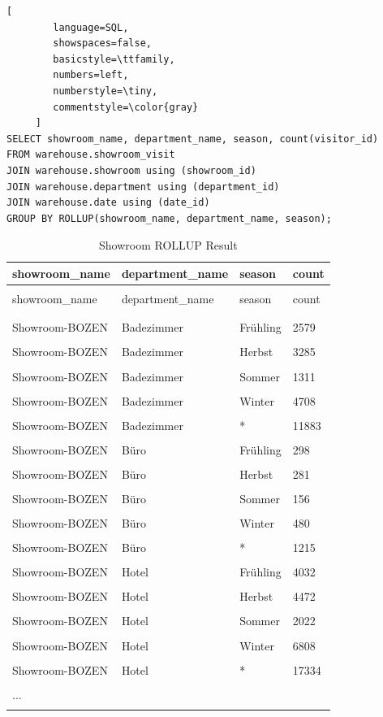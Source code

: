 \documentclass[letterpaper,12pt]{article}
\begin{document}
\begin{lstlisting}[
        language=SQL,
        showspaces=false,
        basicstyle=\ttfamily,
        numbers=left,
        numberstyle=\tiny,
        commentstyle=\color{gray}
     ]
SELECT showroom_name, department_name, season, count(visitor_id)
FROM warehouse.showroom_visit
JOIN warehouse.showroom using (showroom_id)
JOIN warehouse.department using (department_id)
JOIN warehouse.date using (date_id)
GROUP BY ROLLUP(showroom_name, department_name, season);
\end{lstlisting}


\begingroup
\renewcommand\arraystretch{0.5}
\begin{longtable}{p{4cm}p{4cm}p{4cm}p{4cm}}
        \caption{Showroom ROLLUP Result} \\
				showroom\_name & department\_name & season & count \\
        \endfirsthead \\
        showroom\_name & department\_name & season & count \\
        \endhead \\
        \hline \\
				Showroom-BOZEN & Badezimmer & Frühling & 2579 \\
\hline \\
Showroom-BOZEN & Badezimmer & Herbst & 3285 \\
\hline \\
Showroom-BOZEN & Badezimmer & Sommer & 1311 \\
\hline \\
Showroom-BOZEN & Badezimmer & Winter & 4708 \\
\hline \\
Showroom-BOZEN & Badezimmer & * & 11883 \\
\hline \\
Showroom-BOZEN & Büro & Frühling & 298 \\
\hline \\
Showroom-BOZEN & Büro & Herbst & 281 \\
\hline \\
Showroom-BOZEN & Büro & Sommer & 156 \\
\hline \\
Showroom-BOZEN & Büro & Winter & 480 \\
\hline \\
Showroom-BOZEN & Büro & * & 1215 \\
\hline \\
Showroom-BOZEN & Hotel & Frühling & 4032 \\
\hline \\
Showroom-BOZEN & Hotel & Herbst & 4472 \\
\hline \\
Showroom-BOZEN & Hotel & Sommer & 2022 \\
\hline \\
Showroom-BOZEN & Hotel & Winter & 6808 \\
\hline \\
Showroom-BOZEN & Hotel & * & 17334 \\
\hline \\
... & & & \\
\hline \\
\end{longtable} 
\end{document}

